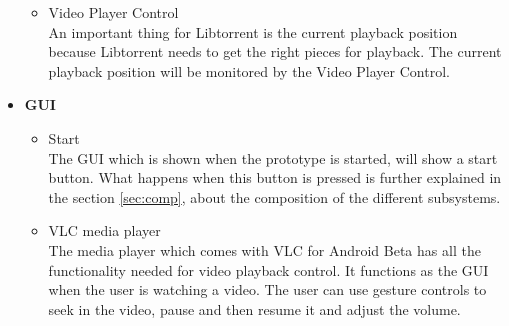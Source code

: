 \begin{itemize}
\begin{itemize}
		\item Video Player Control\\
An important thing for Libtorrent is the current playback position because Libtorrent needs to get the right pieces for playback. The current playback position will be monitored by the Video Player Control.
	\end{itemize}
\item \textbf{GUI}
	\begin{itemize}
		\item Start\\
The GUI which is shown when the prototype is started, will show a start button. What happens when this button is pressed is further explained in the section \ref{sec:comp}, about the composition of the different subsystems.
		\item VLC media player\\
The media player which comes with VLC for Android Beta has all the functionality needed for video playback control. It functions as the GUI when the user is watching a video. The user can use gesture controls to seek in the video, pause and then resume it and adjust the volume.
	\end{itemize}
\end{itemize}
